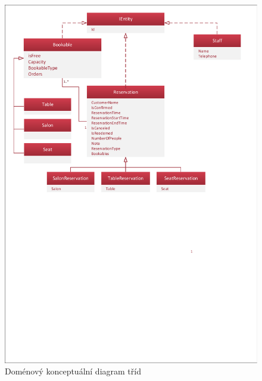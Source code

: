 \newpage
\begin{figure}[h!]
\begin{center}
\includegraphics[scale=0.75]{../02_Vysledne_modely/05_1_ConceptualClassDiagram.pdf}
\caption{Doménový konceptuální diagram tříd}
\label{fig:communication09-1}
\end{center}
\end{figure}


